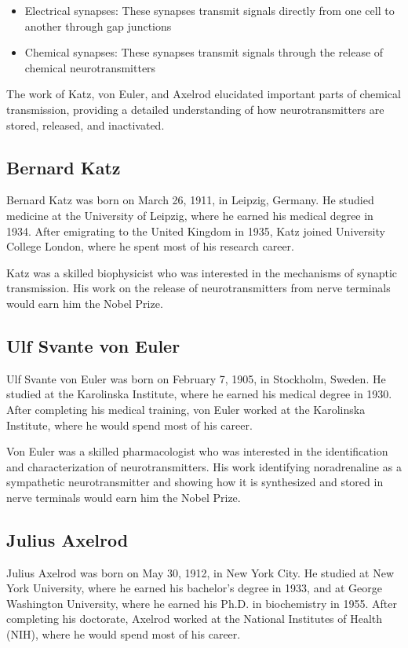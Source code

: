 \begin{itemize}
\item Electrical synapses: These synapses transmit signals directly from one cell to another through gap junctions
\item Chemical synapses: These synapses transmit signals through the release of chemical neurotransmitters
\end{itemize}

The work of Katz, von Euler, and Axelrod elucidated important parts of chemical transmission, providing a detailed understanding of how neurotransmitters are stored, released, and inactivated.

\subsection{Bernard Katz}

Bernard Katz was born on March 26, 1911, in Leipzig, Germany. He studied medicine at the University of Leipzig, where he earned his medical degree in 1934. After emigrating to the United Kingdom in 1935, Katz joined University College London, where he spent most of his research career.

Katz was a skilled biophysicist who was interested in the mechanisms of synaptic transmission. His work on the release of neurotransmitters from nerve terminals would earn him the Nobel Prize.

\subsection{Ulf Svante von Euler}

Ulf Svante von Euler was born on February 7, 1905, in Stockholm, Sweden. He studied at the Karolinska Institute, where he earned his medical degree in 1930. After completing his medical training, von Euler worked at the Karolinska Institute, where he would spend most of his career.

Von Euler was a skilled pharmacologist who was interested in the identification and characterization of neurotransmitters. His work identifying noradrenaline as a sympathetic neurotransmitter and showing how it is synthesized and stored in nerve terminals would earn him the Nobel Prize.

\subsection{Julius Axelrod}

Julius Axelrod was born on May 30, 1912, in New York City. He studied at New York University, where he earned his bachelor's degree in 1933, and at George Washington University, where he earned his Ph.D. in biochemistry in 1955. After completing his doctorate, Axelrod worked at the National Institutes of Health (NIH), where he would spend most of his career.

